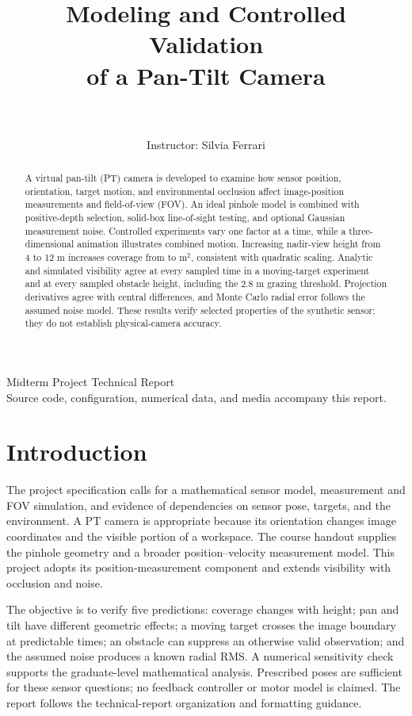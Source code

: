 \documentclass[11pt,letterpaper]{article}
\title{Modeling and Controlled Validation\\of a Pan-Tilt Camera}
\author{\ReportAuthor\\\ReportCourse\\Instructor: Silvia Ferrari}
\date{}
\begin{document}
\begin{titlepage}
\maketitle
\thispagestyle{empty}
\vfill
\begin{center}Midterm Project Technical Report\\
Source code, configuration, numerical data, and media accompany this report.
\end{center}
\vfill
\end{titlepage}

\begin{abstract}
A virtual pan-tilt (PT) camera is developed to examine how sensor position, orientation, target motion, and environmental occlusion affect image-position measurements and field-of-view (FOV). An ideal pinhole model is combined with positive-depth selection, solid-box line-of-sight testing, and optional Gaussian measurement noise. Controlled experiments vary one factor at a time, while a three-dimensional animation illustrates combined motion. Increasing nadir-view height from 4 to 12 m increases coverage from \HeightAreaMin{} to \HeightAreaMax{} m$^2$, consistent with quadratic scaling. Analytic and simulated visibility agree at every sampled time in a moving-target experiment and at every sampled obstacle height, including the 2.8 m grazing threshold. Projection derivatives agree with central differences, and Monte Carlo radial error follows the assumed noise model. These results verify selected properties of the synthetic sensor; they do not establish physical-camera accuracy.
\end{abstract}

\section{Introduction}
The project specification calls for a mathematical sensor model, measurement and FOV simulation, and evidence of dependencies on sensor pose, targets, and the environment\cite{assignment}. A PT camera is appropriate because its orientation changes image coordinates and the visible portion of a workspace. The course handout supplies the pinhole geometry and a broader position--velocity measurement model\cite{handout}. This project adopts its position-measurement component and extends visibility with occlusion and noise.

The objective is to verify five predictions: coverage changes with height; pan and tilt have different geometric effects; a moving target crosses the image boundary at predictable times; an obstacle can suppress an otherwise valid observation; and the assumed noise produces a known radial RMS. A numerical sensitivity check supports the graduate-level mathematical analysis. Prescribed poses are sufficient for these sensor questions; no feedback controller or motor model is claimed. The report follows the technical-report organization and formatting guidance\cite{writing}.
\end{document}
